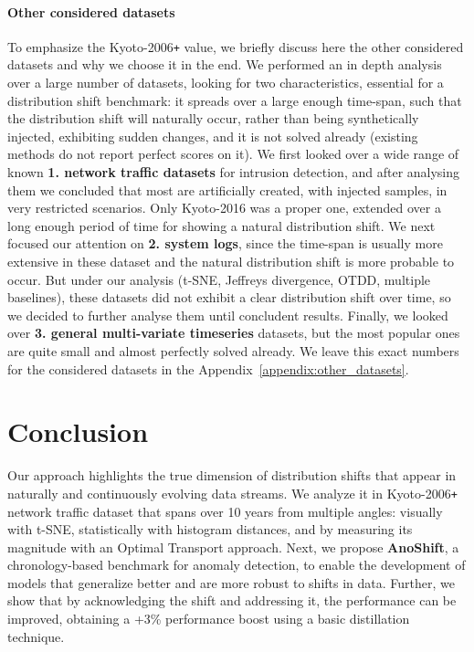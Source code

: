 \documentclass{article}
\begin{document}
\paragraph{Other considered datasets} To emphasize the Kyoto-2006\texttt{+} value, we briefly discuss here the other considered datasets and why we choose it in the end. We performed an in depth analysis over a large number of datasets, looking for two characteristics, essential for a distribution shift benchmark: it spreads over a large enough time-span, such that the distribution shift will naturally occur, rather than being synthetically injected, exhibiting sudden changes, and it is not solved already (existing methods do not report perfect scores on it). We first looked over a wide range of known \textbf{1. network traffic datasets} for intrusion detection, and after analysing them we concluded that most are artificially created, with injected samples, in very restricted scenarios. Only Kyoto-2016 was a proper one, extended over a long enough period of time for showing a natural distribution shift. We next focused our attention on \textbf{2. system logs}, since the time-span is usually more extensive in these dataset and the natural distribution shift is more probable to occur. But under our analysis (t-SNE, Jeffreys divergence, OTDD, multiple baselines), these datasets did not exhibit a clear distribution shift over time, so we decided to further analyse them until concludent results. Finally, we looked over \textbf{3. general multi-variate timeseries} datasets, but the most popular ones are quite small and almost perfectly solved already. We leave this exact numbers for the considered datasets in the Appendix~\ref{appendix:other_datasets}.


\section{Conclusion}
    Our approach highlights the true dimension of distribution shifts that appear in naturally and continuously evolving data streams. We analyze it in Kyoto-2006\texttt{+} network traffic dataset that spans over 10 years from multiple angles: visually with t-SNE, statistically with histogram distances, and by measuring its magnitude with an Optimal Transport approach. Next, we propose \textbf{AnoShift}, a chronology-based benchmark for anomaly detection, to enable the development of models that generalize better and are more robust to shifts in data. Further, we show that by acknowledging the shift and addressing it, the performance can be improved, obtaining a +3\% performance boost using a basic distillation technique.
\end{document}
